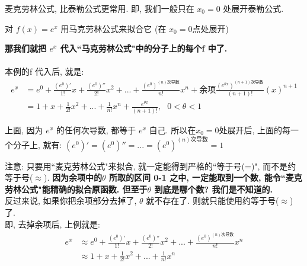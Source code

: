 \documentclass[UTF8]{ctexart}
\begin{document}
麦克劳林公式, 比泰勒公式更常用. 即, 我们一般只在 $x_0=0$ 处展开泰勒公式. \\


\begin{myEnvSample}
	对 $f(x)=e^x$ 用马克劳林公式来拟合它 (在 $x_0 = 0$点处展开)
	
	\textbf{那我们就把 $e^x$ 代入``马克劳林公式"中的分子上的每个f 中了.} \\
	
	 \\

	本例的f 代入后, 就是: 	
	\begin{align*}  %
			 e^x &= e^0+\frac{\left( e^0 \right) '}{1!}x+\frac{\left( e^0 \right) ''}{2!}x^2+...+\frac{\left( e^0 \right) ^{\left( n \right) \text{次导数}}}{n!}x^n+\text{余项}\frac{\left( e^{\theta x} \right) ^{\left( n+1 \right) \text{次导数}}}{\left( n+1 \right) !}\left( x \right) ^{n+1}\\
			& =1+x+\frac{1}{2!}x^2+...+\frac{1}{n!}x^n+\frac{e^{\theta x}}{\left( n+1 \right) !},\ \ \ 0<\theta <1		
	\end{align*}
	
上面, 因为 $e^x$ 的任何次导数, 都等于 $e^x$ 自己. 所以在$x_0 = 0$处展开后, 上面的每一个分子上, 就有: $\left( e^0 \right) '=\left( e^0 \right) ''=...=\left( e^0 \right) ^{\left( n \right) \text{次导数}} =1$ \\

\end{myEnvSample}



注意: 只要用``麦克劳林公式"来拟合, 就一定能得到严格的``等于号(=)", 而不是约等于号($\approx$). \textbf{因为余项中的$\theta$ 所取的区间 0-1 之中, 一定能取到一个数, 能令``麦克劳林公式"能精确的拟合原函数. 但至于$\theta$ 到底是哪个数? 我们是不知道的.} \\

反过来说, 如果你把余项部分去掉了, $\theta$ 就不存在了. 则就只能使用约等于号($\approx$)了. \\


即, 去掉余项后, 上例就是: 
\begin{align*}  %
	e^x & \approx e^0+\frac{\left( e^0 \right) '}{1!}x+\frac{\left( e^0 \right) ''}{2!}x^2+...+\frac{\left( e^0 \right) ^{\left( n \right) \text{次导数}}}{n!}x^n\\
	& \approx 1+x+\frac{1}{2!}x^2+...+\frac{1}{n!}x^n  
\end{align*}
\end{document}
